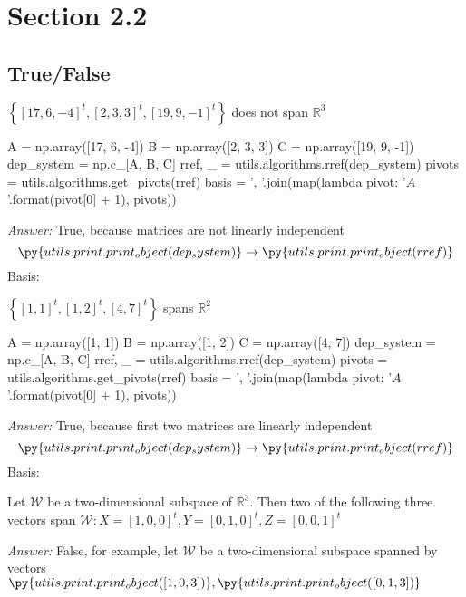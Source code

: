 \documentclass[letterpaper]{article}
\newcommand{\ans}{\textit{Answer: }}
\newenvironment{question}[2][Question]{\begin{trivlist}
\item[\hskip \labelsep {\bfseries #1}\hskip \labelsep {\bfseries #2.}]}{\end{trivlist}}
\newcommand{\printobj}[1]{\py{utils.print.print_object(#1)}}
\begin{document}
\section{Section 2.2}
\subsection{True/False}

\begin{question}{2.10}
    $\left\{ [ 17,6 , - 4 ] ^ { t } , [ 2,3,3 ] ^ { t } , [ 19,9 , - 1 ] ^ { t } \right\}$ 
    does not span $\mathbb { R } ^ { 3 }$

    \begin{pycode}
A = np.array([17, 6, -4])
B = np.array([2, 3, 3])
C = np.array([19, 9, -1])
dep_system = np.c_[A, B, C]
rref, _ = utils.algorithms.rref(dep_system)
pivots = utils.algorithms.get_pivots(rref)
basis = ', '.join(map(lambda pivot: '$A_{}$'.format(pivot[0] + 1), pivots))
    \end{pycode}

    \ans True, because matrices are not linearly independent
    $$\printobj{dep_system} \rightarrow \printobj{rref}$$
    Basis: 
\end{question}

\begin{question}{2.11}
    $\left\{ [ 1,1 ] ^ { t } , [ 1,2 ] ^ { t } , [ 4,7 ] ^ { t } \right\}$ spans $\mathbb { R } ^ { 2 }$

    \begin{pycode}
A = np.array([1, 1])
B = np.array([1, 2])
C = np.array([4, 7])
dep_system = np.c_[A, B, C]
rref, _ = utils.algorithms.rref(dep_system)
pivots = utils.algorithms.get_pivots(rref)
basis = ', '.join(map(lambda pivot: '$A_{}$'.format(pivot[0] + 1), pivots))
    \end{pycode}

    \ans True, because first two matrices are linearly independent
    $$\printobj{dep_system} \rightarrow \printobj{rref}$$
    Basis: 
\end{question}

\begin{question}{2.12}
    Let $\mathcal { W }$ be a two-dimensional subspace of $\mathbb { R } ^ { 3 } .$ 
    Then two of the following three
    vectors span $\mathcal { W } : X = [ 1,0,0 ] ^ { t } , Y = [ 0,1,0 ] ^ { t } , Z = [ 0,0,1 ] ^ { t }$

    \ans False, for example, let $\mathcal { W }$ be a two-dimensional subspace 
    spanned by vectors $\printobj{[1, 0, 3]}, \printobj{[0, 1, 3]}$
\end{question}
\end{document}
